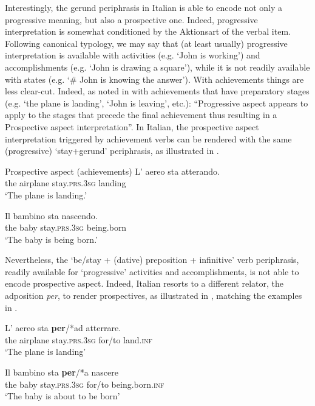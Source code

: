 \documentclass[output=paper,modfonts,nonflat,newtxmath,colorlinks,citecolor=brown]{langsci/langscibook}
\begin{document}
Interestingly, the gerund periphrasis in Italian is able to encode not only a progressive meaning, but also a prospective one. Indeed, progressive interpretation is somewhat conditioned by the Aktionsart of the verbal item. Following  canonical typology, we may say that (at least usually) progressive interpretation is available with {activities} (e.g. ‘John is working’) and {accomplishments} (e.g. ‘John is drawing a square’), while it is not readily available with {states} (e.g. ‘\# John is knowing the answer’). With {achievements} things are less clear-cut. Indeed, as noted in \citet[538]{Cinque2017} with achievements that have preparatory stages (e.g. ‘the plane is landing’, ‘John is leaving’, etc.): “Progressive aspect appears to apply to the stages that precede the final achievement thus resulting in a Prospective aspect interpretation”. In Italian, the prospective aspect interpretation triggered by achievement verbs can be rendered with the same (progressive) ‘stay+gerund’ periphrasis, as illustrated in .

\ea Prospective aspect (achievements)%
	\label{ex:franco:22}
    \ea \label{ex:franco:22a}
    \gll L’ aereo sta atterando.\\
        	the airplane stay.\textsc{prs.3sg} landing\\
    \glt ‘The plane is landing.’

     \ex \label{ex:franco:22b}
    \gll Il bambino sta nascendo.  \\
        the baby stay.\textsc{prs.3sg} being.born\\
    \glt ‘The baby is being born.’
    \z
    \z

Nevertheless, the ‘be/stay + (dative) preposition + infinitive’ verb periphrasis, readily available for ‘progressive’ activities and accomplishments, is not able to encode prospective aspect. Indeed, Italian resorts to a different relator, the adposition \textit{per}, to render prospectives, as illustrated in , matching the examples in .

\ea%
	\label{ex:franco:23}
    \ea \label{ex:franco:23a}
    \gll L’ aereo sta \textbf{per}/*ad atterrare.\\
       the airplane stay.\textsc{prs.3sg} for/to land.\textsc{inf}\\
    \glt  ‘The plane is landing’

     \ex \label{ex:franco:23b}
    \gll  Il bambino sta \textbf{per}/*a nascere\\
        the baby stay.\textsc{prs.3sg} for/to being.born.\textsc{inf}\\
    \glt ‘The baby is about to be born’
    \z
    \z
\end{document}
